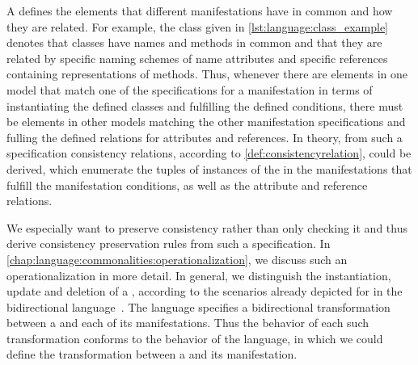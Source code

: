 A \commonality defines the elements that different manifestations have in common and how they are related.
For example, the class \commonality given in \autoref{lst:language:class_example} denotes that classes have names and methods in common and that they are related by specific naming schemes of name attributes and specific references containing representations of methods.
Thus, whenever there are elements in one model that match one of the specifications for a manifestation in terms of instantiating the defined classes and fulfilling the defined conditions, there must be elements in other models matching the other manifestation specifications and fulling the defined relations for attributes and references.
In theory, from such a specification consistency relations, according to \autoref{def:consistencyrelation}, could be derived, which enumerate the tuples of instances of the \metaclasses in the manifestations that fulfill the manifestation conditions, as well as the attribute and reference relations.

We especially want to preserve consistency rather than only checking it and thus derive consistency preservation rules from such a specification.
In \autoref{chap:language:commonalities:operationalization}, we discuss such an operationalization in more detail.
In general, we distinguish the instantiation, update and deletion of a \commonality, according to the scenarios already depicted for \mappings in the bidirectional \mappings language~\cite[Sec.~7.2.1]{klare2020Vitruv-JSS}.
The \commonalities language specifies a bidirectional transformation between a \commonality and each of its manifestations.
Thus the behavior of each such transformation conforms to the behavior of the \mappings language, in which we could define the transformation between a \commonality and its manifestation.

